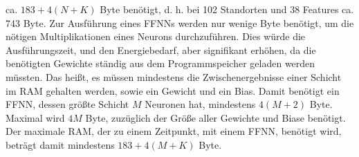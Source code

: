 ca. $183 + 4(N + K)$ Byte benötigt, d. h. bei 102 Standorten und 38 Features ca. 743 Byte.
\newline
\newline
Zur Ausführung eines FFNNs werden nur wenige Byte benötigt, um die nötigen Multiplikationen eines Neurons durchzuführen.
Dies würde die Ausführungszeit, und den Energiebedarf, aber signifikant erhöhen, da die benötigten Gewichte ständig aus dem Programmspeicher geladen werden müssten.
Das heißt, es müssen mindestens die Zwischenergebnisse einer Schicht im RAM gehalten werden, sowie ein Gewicht und ein Bias.
\newline
\newline
Damit benötigt ein FFNN, dessen größte Schicht $M$ Neuronen hat, mindestens $4(M+2)$ Byte.
Maximal wird $4M$ Byte, zuzüglich der Größe aller Gewichte und Biase benötigt.
Der maximale RAM, der zu einem Zeitpunkt, mit einem FFNN, benötigt wird, beträgt damit mindestens $183 + 4(M + K)$ Byte.